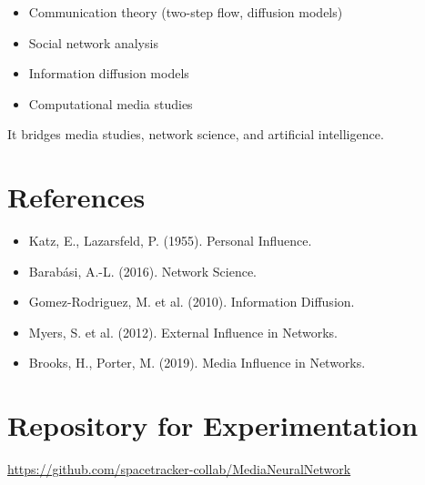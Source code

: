 \documentclass[12pt]{article}
\begin{document}
\begin{itemize}
\item Communication theory (two-step flow, diffusion models)
\item Social network analysis
\item Information diffusion models
\item Computational media studies
\end{itemize}

It bridges media studies, network science, and artificial intelligence.

\section{References}

\begin{itemize}
\item Katz, E., Lazarsfeld, P. (1955). Personal Influence.
\item Barabási, A.-L. (2016). Network Science.
\item Gomez-Rodriguez, M. et al. (2010). Information Diffusion.
\item Myers, S. et al. (2012). External Influence in Networks.
\item Brooks, H., Porter, M. (2019). Media Influence in Networks.
\end{itemize}

\section{Repository for Experimentation}

\noindent
\url{https://github.com/spacetracker-collab/MediaNeuralNetwork}
\end{document}
